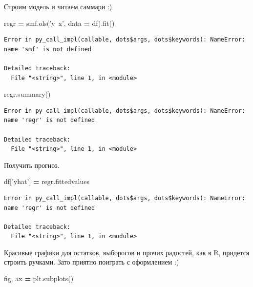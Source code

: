 \documentclass[]{book}
\newenvironment{Shaded}{\begin{snugshade}}{\end{snugshade}}
\newcommand{\NormalTok}[1]{#1}
\newcommand{\OperatorTok}[1]{\textcolor[rgb]{0.81,0.36,0.00}{\textbf{#1}}}
\newcommand{\StringTok}[1]{\textcolor[rgb]{0.31,0.60,0.02}{#1}}
\begin{document}
Строим модель и читаем саммари :)

\begin{Shaded}
\begin{Highlighting}[]
\NormalTok{regr }\OperatorTok{=}\NormalTok{ smf.ols(}\StringTok{'y~x'}\NormalTok{, data }\OperatorTok{=}\NormalTok{ df).fit()}
\end{Highlighting}
\end{Shaded}

\begin{verbatim}
Error in py_call_impl(callable, dots$args, dots$keywords): NameError: name 'smf' is not defined

Detailed traceback: 
  File "<string>", line 1, in <module>
\end{verbatim}

\begin{Shaded}
\begin{Highlighting}[]
\NormalTok{regr.summary()}
\end{Highlighting}
\end{Shaded}

\begin{verbatim}
Error in py_call_impl(callable, dots$args, dots$keywords): NameError: name 'regr' is not defined

Detailed traceback: 
  File "<string>", line 1, in <module>
\end{verbatim}

Получить прогноз.

\begin{Shaded}
\begin{Highlighting}[]
\NormalTok{df[}\StringTok{'yhat'}\NormalTok{] }\OperatorTok{=}\NormalTok{ regr.fittedvalues}
\end{Highlighting}
\end{Shaded}

\begin{verbatim}
Error in py_call_impl(callable, dots$args, dots$keywords): NameError: name 'regr' is not defined

Detailed traceback: 
  File "<string>", line 1, in <module>
\end{verbatim}

Красивые графики для остатков, выборосов и прочих радостей, как в R, придется строить ручками. Зато приятно поиграть с оформлением :)

\begin{Shaded}
\begin{Highlighting}[]
\NormalTok{fig, ax }\OperatorTok{=}\NormalTok{ plt.subplots()}
\end{Highlighting}
\end{Shaded}
\end{document}
